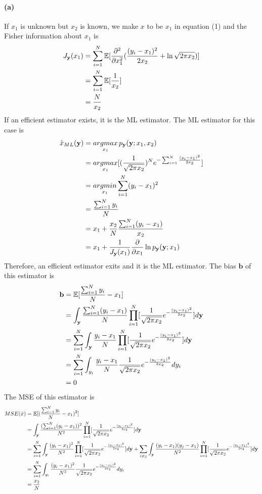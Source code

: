 \documentclass{article}
\begin{document}
\paragraph{(a)}
If $x_1$ is unknown but $x_2$ is known, we make $x$ to be $x_1$ in equation (1) and the Fisher information about $x_1$ is
\begin{align}
	J_{\mathbf{y}}(x_1)&=\sum_{i=1}^N\mathbb{E}[\frac{\partial^2}{\partial x_1^2}(\frac{(y_i-x_1)^2}{2x_2}+\ln \sqrt{2\pi x_2})]\notag\\
	&=\sum_{i=1}^N\mathbb{E}[\frac{1}{x_2}]\notag\\
	&=\frac{N}{x_2}\notag
\end{align}
If an efficient estimator exists, it is the ML estimator. The ML estimator for this case is
\begin{align}
	\hat{x}_{ML}(\mathbf{y})&=\mathop{argmax}_{x_1}p_{\mathbf{y}}(\mathbf{y};x_1,x_2)\notag\\
	&=\mathop{argmax}_{x_1}[(\frac{1}{\sqrt{2\pi x_2}})^Ne^{-\sum_{i=1}^N\frac{(y_i-x_1)^2}{2x_2}}]\notag\\
	&=\mathop{argmin}_{x_1}\sum_{i=1}^N(y_i-x_1)^2\notag\\
	&=\frac{\sum_{i=1}^N y_i}{N}\notag\\
	&=x_1+\frac{x_2}{N}\frac{\sum_{i=1}^N(y_i-x_1)}{x_2}\notag\\
	&=x_1+\frac{1}{J_{\mathbf{y}}(x_1)}\frac{\partial}{\partial x_1}\ln p_{\mathbf{y}}(\mathbf{y};x_1)\notag
\end{align}
Therefore, an efficient estimator exits and it is the ML estimator. The bias $\mathbf{b}$ of this estimator is
\begin{align}
	\mathbf{b}&=\mathbb{E}[\frac{\sum_{i=1}^N y_i}{N}-x_1]\notag\\
	&=\int_{\mathbf{y}}\frac{\sum_{i=1}^N(y_i-x_1)}{N}\prod_{i=1}^N[\frac{1}{\sqrt{2\pi x_2}}e^{-\frac{(y_i-x_1)^2}{2x_2}}]d\mathbf{y}\notag\\
	&=\sum_{i=1}^N\int_{\mathbf{y}}\frac{y_i-x_1}{N}\prod_{i=1}^N[\frac{1}{\sqrt{2\pi x_2}}e^{-\frac{(y_i-x_1)^2}{2x_2}}]d\mathbf{y}\notag\\
	&=\sum_{i=1}^N\int_{y_i}\frac{y_i-x_1}{N}\frac{1}{\sqrt{2\pi x_2}}e^{-\frac{(y_i-x_1)^2}{2x_2}}dy_i\notag\\
	&=0\notag
\end{align}
The MSE of this estimator is
\begin{align}
	MSE(\hat{x})&=\mathbb{E}[(\frac{\sum_{i=1}^N y_i}{N}-x_1)^2]\notag\\
	&=\int_{\mathbf{y}}\frac{(\sum_{i=1}^N(y_i-x_1))^2}{N^2}\prod_{i=1}^N[\frac{1}{\sqrt{2\pi x_2}}e^{-\frac{(y_i-x_1)^2}{2x_2}}]d\mathbf{y}\notag\\
	&=\sum_{i=1}^N\int_{\mathbf{y}}\frac{(y_i-x_1)^2}{N^2}\prod_{i=1}^N[\frac{1}{\sqrt{2\pi x_2}}e^{-\frac{(y_i-x_1)^2}{2x_2}}]d\mathbf{y}+\sum_{i\neq j}\int_{\mathbf{y}}\frac{(y_i-x_1)(y_j-x_1)}{N^2}\prod_{i=1}^N[\frac{1}{\sqrt{2\pi x_2}}e^{-\frac{(y_i-x_1)^2}{2x_2}}]d\mathbf{y}\notag\\
	&=\sum_{i=1}^N\int_{y_i}\frac{(y_i-x_1)^2}{N^2}\frac{1}{\sqrt{2\pi x_2}}e^{-\frac{(y_i-x_1)^2}{2x_2}}dy_i\notag\\
	&=\frac{x_2}{N}\notag
\end{align}
\end{document}
